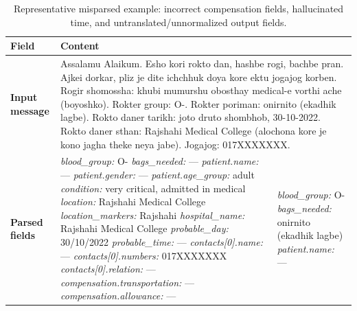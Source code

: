 \documentclass[11pt]{article}
\begin{document}
\begin{table}[t]
\centering
\small
\caption{Representative misparsed example: incorrect compensation fields, hallucinated time, and untranslated/unnormalized output fields.}
\label{tab:misparsed-3-compensation}
\begin{tabularx}{\textwidth}{@{}p{}XX@{}}
\toprule
\textbf{Field} & \multicolumn{2}{l}{\textbf{Content}} \\
\midrule
\textbf{Input message} &
\multicolumn{2}{p{0.75\textwidth}}{Assalamu Alaikum. Esho kori rokto dan, hashbe rogi, bachbe pran. Ajkei dorkar, pliz je dite ichchhuk doya kore ektu jogajog korben. Rogir shomossha: khubi mumurshu obosthay medical-e vorthi ache (boyoshko). Rokter group: O-. Rokter poriman: onirnito (ekadhik lagbe). Rokto daner tarikh: joto druto shombhob, 30-10-2022. Rokto daner sthan: Rajshahi Medical College (alochona kore je kono jagha theke neya jabe). Jogajog: 017XXXXXXX.} \\
\midrule
\textbf{Parsed fields} &
{\ttfamily\footnotesize
\textit{blood\_group:} O-\newline
\textit{bags\_needed:} ---\newline
\textit{patient.name:} ---\newline
\textit{patient.gender:} ---\newline
\textit{patient.age\_group:} adult\newline
\textit{condition:} very critical, admitted in medical\newline
\textit{location:} Rajshahi Medical College\newline
\textit{location\_markers:} Rajshahi\newline
\textit{hospital\_name:} Rajshahi Medical College\newline
\textit{probable\_day:} 30/10/2022\newline
\textit{probable\_time:} ---\newline
\textit{contacts[0].name:} ---\newline
\textit{contacts[0].numbers:} 017XXXXXXX\newline
\textit{contacts[0].relation:} ---\newline
\textit{compensation.transportation:} ---\newline
\textit{compensation.allowance:} ---
} &
{\ttfamily\footnotesize
\textit{blood\_group:} O-\newline
\textit{bags\_needed:} onirnito (ekadhik lagbe)\newline
\textit{patient.name:} ---\newline
}
\end{tabularx}
\end{table}
\end{document}
